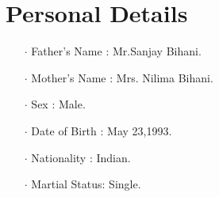 \documentclass[12pt]{article}
\begin{document}
\section*{Personal Details}
\begin{itemize}
\item[$\cdot$]Father's Name : Mr.Sanjay Bihani.
\item[$\cdot$]Mother's Name : Mrs. Nilima Bihani.
\item[$\cdot$]Sex           : Male.
\item[$\cdot$]Date of Birth : May 23,1993.
\item[$\cdot$]Nationality   : Indian.
\item[$\cdot$]Martial Status: Single.
\end{itemize}
\end{document}
